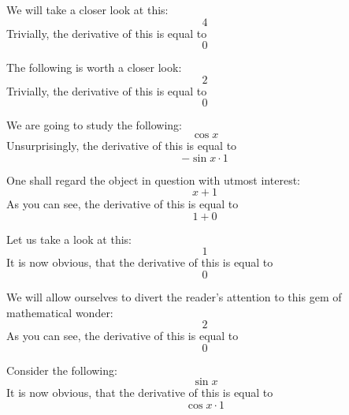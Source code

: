 \documentclass{article}
\begin{document}
We will take a closer look at this:
\begin{equation}
4 
\end{equation}
Trivially, the derivative of this is equal to
\begin{equation}
0 
\end{equation}

The following is worth a closer look:
\begin{equation}
2 
\end{equation}
Trivially, the derivative of this is equal to
\begin{equation}
0 
\end{equation}

We are going to study the following:
\begin{equation}
\cos x 
\end{equation}
Unsurprisingly, the derivative of this is equal to
\begin{equation}
-\sin x \cdot 1 
\end{equation}

One shall regard the object in question with utmost interest:
\begin{equation}
x + 1 
\end{equation}
As you can see, the derivative of this is equal to
\begin{equation}
1 + 0 
\end{equation}

Let us take a look at this:
\begin{equation}
1 
\end{equation}
It is now obvious, that the derivative of this is equal to
\begin{equation}
0 
\end{equation}

We will allow ourselves to divert the reader's attention to this gem of mathematical wonder:
\begin{equation}
2 
\end{equation}
As you can see, the derivative of this is equal to
\begin{equation}
0 
\end{equation}

Consider the following:
\begin{equation}
\sin x 
\end{equation}
It is now obvious, that the derivative of this is equal to
\begin{equation}
\cos x \cdot 1 
\end{equation}
\end{document}
